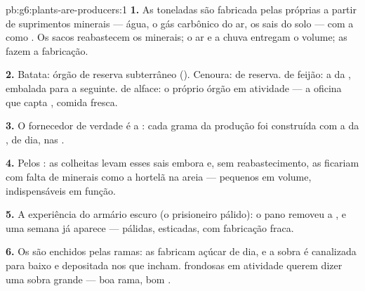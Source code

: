 \begin{solution}{pb:g6:plants-are-producers:1}
\textbf{1.} As toneladas são  fabricada pelas próprias
 a partir de suprimentos minerais --- água, o gás carbônico do
ar, os sais do solo --- com a  como . Os sacos reabastecem
os minerais; o ar e a chuva entregam o volume; as  fazem a
fabricação.

\textbf{2.} Batata: órgão de reserva subterrâneo ().
Cenoura:  de reserva.  de feijão: a  da
, embalada para a  seguinte.  de alface: o próprio
órgão em atividade --- a oficina que capta , comida fresca.

\textbf{3.} O fornecedor de verdade é a : cada grama da produção
foi construída com a  da , de dia, nas .

\textbf{4.} Pelos : as colheitas levam esses sais
embora e, sem reabastecimento, as  ficariam com falta de
minerais como a hortelã na areia --- pequenos em volume,
indispensáveis em função.

\textbf{5.} A experiência do armário escuro (o prisioneiro pálido): o
pano removeu a , e uma semana já aparece --- pálidas, esticadas,
com fabricação fraca.

\textbf{6.} Os  são enchidos pelas ramas: as 
fabricam açúcar de dia, e a sobra é canalizada para baixo e
depositada nos  que incham.  frondosas em atividade
querem dizer uma sobra grande --- boa rama, bom .


\end{solution}
